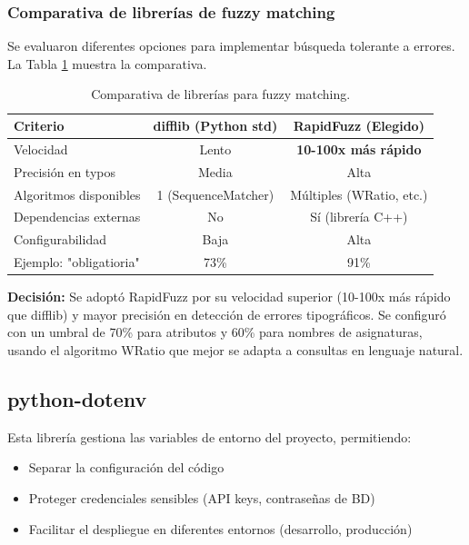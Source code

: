 \subsubsection{Comparativa de librerías de fuzzy matching}

Se evaluaron diferentes opciones para implementar búsqueda tolerante a errores. La Tabla \ref{tab:comp-fuzzy} muestra la comparativa.

\begin{table}[h]
\centering
\begin{tabular}{|l|c|c|}
\hline
\textbf{Criterio} & \textbf{difflib (Python std)} & \textbf{RapidFuzz (Elegido)} \\ \hline
Velocidad & Lento & \textbf{10-100x más rápido} \\ \hline
Precisión en typos & Media & Alta \\ \hline
Algoritmos disponibles & 1 (SequenceMatcher) & Múltiples (WRatio, etc.) \\ \hline
Dependencias externas & No & Sí (librería C++) \\ \hline
Configurabilidad & Baja & Alta \\ \hline
Ejemplo: "obligatioria" & 73\% & 91\% \\ \hline
\end{tabular}
\caption{Comparativa de librerías para fuzzy matching.}
\label{tab:comp-fuzzy}
\end{table}

\textbf{Decisión:} Se adoptó RapidFuzz por su velocidad superior (10-100x más rápido que difflib) y mayor precisión en detección de errores tipográficos. Se configuró con un umbral de 70\% para atributos y 60\% para nombres de asignaturas, usando el algoritmo WRatio que mejor se adapta a consultas en lenguaje natural.

\subsection{python-dotenv}

Esta librería gestiona las variables de entorno del proyecto, permitiendo:

\begin{itemize}
    \item Separar la configuración del código
    \item Proteger credenciales sensibles (API keys, contraseñas de BD)
    \item Facilitar el despliegue en diferentes entornos (desarrollo, producción)
\end{itemize}


